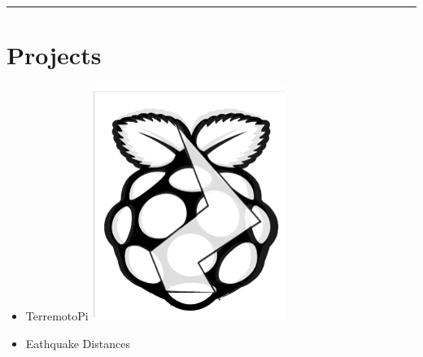 \documentclass{article}
\begin{document}
\begin{minipage}[t]{0.69\textwidth}
\begin{minipage}{0.49\textwidth}
		\end{minipage}
		\hrule
		\section*{\fontsize{18pt}{24pt}\selectfont \color{pblue} Projects}
		\begin{itemize}
		\item TerremotoPi \href{https://github.com/silvioschwarz/TerremotoPi}{\includegraphics[scale=0.05]{../img/terremotoPiIcon.png}}
		\item Eathquake Distances \href{https://github.com/silvioschwarz/Earthquake-Distances}{\faGithub}
		\end{itemize}
\end{minipage}
\end{document}
